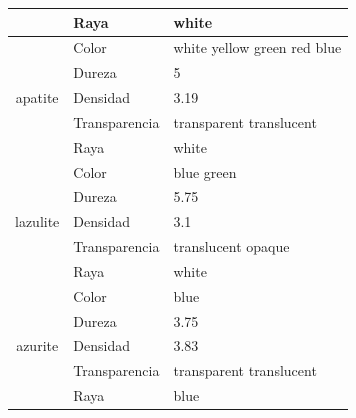 \documentclass[a4paper,10pt]{article}
\begin{document}
\begin{tabular}{|c|l|l|}
        & Raya & white \\ \hline
    \multirow{5}{*}{apatite} 
        & Color & white yellow green red blue \\
        & Dureza & 5 \\
        & Densidad & 3.19 \\
        & Transparencia & transparent translucent \\
        & Raya & white \\ \hline
    \multirow{5}{*}{lazulite} 
        & Color & blue green \\
        & Dureza & 5.75 \\
        & Densidad & 3.1 \\
        & Transparencia & translucent opaque \\
        & Raya & white \\ \hline
    \multirow{5}{*}{azurite} 
        & Color & blue \\
        & Dureza & 3.75 \\
        & Densidad & 3.83 \\
        & Transparencia & transparent translucent \\
        & Raya & blue \\ \hline
\end{tabular}
        
\end{document}
